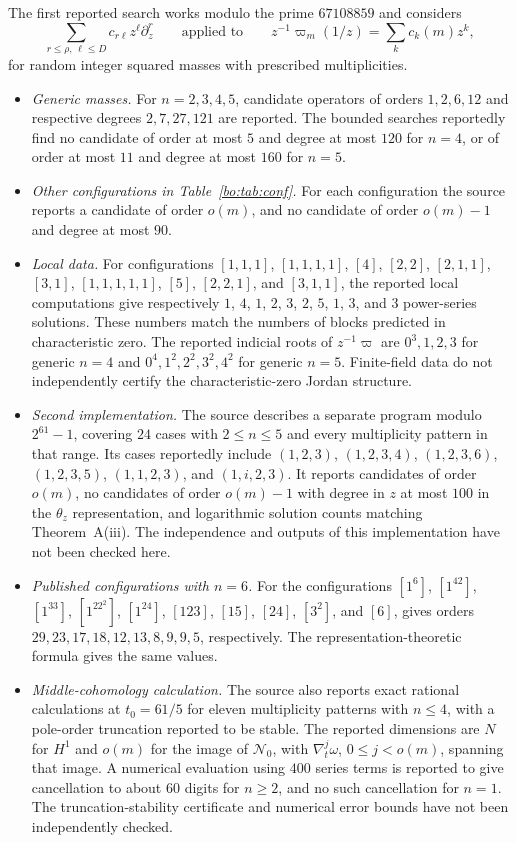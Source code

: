 \documentclass[11pt,a4paper]{article}
\theoremstyle{definition}
\theoremstyle{remark}
\numberwithin{equation}{section}
\newcommand{\cN}{\mathcal{N}}
\begin{document}
The first reported search works modulo the prime $67108859$ and considers
\[
\sum_{r\le\rho,\,\ell\le D}c_{r\ell}z^\ell\partial_z^r
\qquad\text{applied to}\qquad
z^{-1}\varpi_m(1/z)=\sum_kc_k(m)z^k,
\]
for random integer squared masses with prescribed multiplicities.
\begin{itemize}
\item \emph{Generic masses.} For $n=2,3,4,5$, candidate operators of orders $1,2,6,12$ and respective degrees $2,7,27,121$ are reported. The bounded searches reportedly find no candidate of order at most $5$ and degree at most $120$ for $n=4$, or of order at most $11$ and degree at most $160$ for $n=5$.
\item \emph{Other configurations in Table~\ref{bo:tab:conf}.} For each configuration the source reports a candidate of order $o(m)$, and no candidate of order $o(m)-1$ and degree at most $90$.
\item \emph{Local data.} For configurations $[1,1,1]$, $[1,1,1,1]$, $[4]$, $[2,2]$, $[2,1,1]$, $[3,1]$, $[1,1,1,1,1]$, $[5]$, $[2,2,1]$, and $[3,1,1]$, the reported local computations give respectively $1$, $4$, $1$, $2$, $3$, $2$, $5$, $1$, $3$, and $3$ power-series solutions. These numbers match the numbers of blocks predicted in characteristic zero. The reported indicial roots of $z^{-1}\varpi$ are $0^3,1,2,3$ for generic $n=4$ and $0^4,1^2,2^2,3^2,4^2$ for generic $n=5$. Finite-field data do not independently certify the characteristic-zero Jordan structure.
\item \emph{Second implementation.} The source describes a separate program modulo $2^{61}-1$, covering $24$ cases with $2\le n\le5$ and every multiplicity pattern in that range. Its cases reportedly include $(1,2,3)$, $(1,2,3,4)$, $(1,2,3,6)$, $(1,2,3,5)$, $(1,1,2,3)$, and $(1,i,2,3)$. It reports candidates of order $o(m)$, no candidates of order $o(m)-1$ with degree in $z$ at most $100$ in the $\theta_z$ representation, and logarithmic solution counts matching Theorem~A(iii). The independence and outputs of this implementation have not been checked here.
\item \emph{Published configurations with $n=6$.} For the configurations $[1^6]$, $[1^42]$, $[1^33]$, $[1^22^2]$, $[1^24]$, $[123]$, $[15]$, $[24]$, $[3^2]$, and $[6]$, \cite[\S4.5]{LV23} gives orders $29,23,17,18,12,13,8,9,9,5$, respectively. The representation-theoretic formula gives the same values.
\item \emph{Middle-cohomology calculation.} The source also reports exact rational calculations at $t_0=61/5$ for eleven multiplicity patterns with $n\le4$, with a pole-order truncation reported to be stable. The reported dimensions are $N$ for $H^1$ and $o(m)$ for the image of $\cN_0$, with $\nabla_t^j\omega$, $0\le j<o(m)$, spanning that image. A numerical evaluation using $400$ series terms is reported to give cancellation to about $60$ digits for $n\ge2$, and no such cancellation for $n=1$. The truncation-stability certificate and numerical error bounds have not been independently checked.
\end{itemize}
\end{document}
